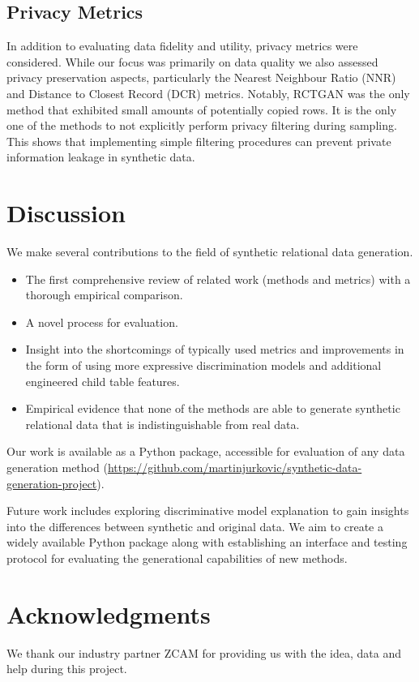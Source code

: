 \documentclass[fleqn,moreauthors,10pt]{ds_report}
\begin{document}
\subsection{Privacy Metrics}

In addition to evaluating data fidelity and utility, privacy metrics were considered. While our focus was primarily on data quality we also assessed privacy preservation aspects, particularly the Nearest Neighbour Ratio (NNR) and Distance to Closest Record (DCR) metrics. Notably, RCTGAN was the only method that exhibited small amounts of potentially copied rows. It is the only one of the methods to not explicitly perform privacy filtering during sampling. This shows that implementing simple filtering procedures can prevent private information leakage in synthetic data.


\section{Discussion}
We make several contributions to the field of synthetic relational data generation.
\vspace{-0.2cm}
\begin{itemize}
\setlength\itemsep{0.1em}
\item The first comprehensive review of related work (methods and metrics) with a thorough empirical comparison.
\item A novel process for evaluation.
\item Insight into the shortcomings of typically used metrics and improvements in the form of using more expressive discrimination models and additional engineered child table features.
\item Empirical evidence that none of the methods are able to generate synthetic relational data that is indistinguishable from real data.
\end{itemize}

Our work is available as a Python package, accessible for evaluation of any data generation method (\url{https://github.com/martinjurkovic/synthetic-data-generation-project}).

Future work includes exploring discriminative model explanation to gain insights into the differences between synthetic and original data. We aim to create a widely available Python package along with establishing an interface and testing protocol for evaluating the generational capabilities of new methods.



\section*{Acknowledgments}
We thank our industry partner ZCAM for providing us with the idea, data and help during this project.




\end{document}
